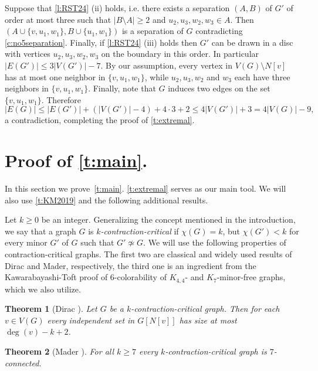 \documentclass[reqno,final,12pt]{amsart}
\newtheorem{thm}{Theorem}
\begin{document}
{Suppose that  \cref{l:RST24} (ii) holds, i.e. there exists a separation $(A,B)$ of $G'$ of order at most three such that $|B \setminus A| \geq 2$ and $u_2,u_3,w_2,w_3 \in A$. Then $(A \cup\{v,u_1,w_1\}, B \cup \{u_1,w_1\})$ is a separation of $G$ contradicting \cref{c:no5separation}. Finally, if   \cref{l:RST24} (iii) holds then $G'$ can be drawn in a disc with vertices $u_2,u_3,w_2,w_3$ on the boundary in this order. In particular $|E(G')| \leq 3|V(G')|-7$. By our assumption, every vertex in $V(G) \setminus N[v]$ has at most one neighbor in  $\{v,u_1,w_1\}$, while $u_2,u_3,w_2$ and $w_3$ each have three neighbors in $\{v,u_1,w_1\}$. Finally, note that $G$ induces two edges on the set  $\{v,u_1,w_1\}$. Therefore
$$ |E(G)| \leq |E(G')| + (|V(G')| -4)  + 4\cdot 3 + 2 \leq 4|V(G')| + 3 = 4|V(G)|-9,
$$
a contradiction, completing the proof of \cref{t:extremal}.


\section {Proof of \cref{t:main}.}\label{s:main} 

In this section we prove~\cref{t:main}. \cref{t:extremal} serves as our main tool. We will also use \cref{t:KM2019} and  the following additional results.

Let $k \geq 0$ be an integer.
Generalizing the concept mentioned in the introduction, we say that a graph $G$ is \emph{$k$-contraction-critical}  if $\chi(G)=k$, but $\chi(G') < k$ for every minor $G'$ of $G$ such that $G' \not\simeq G$. We will use the following properties of contraction-critical graphs.
The first two are classical and widely used results of Dirac and Mader, respectively, the third one is an ingredient from the  Kawarabayashi-Toft proof of $6$-colorability of $K_{4,4}$- and $K_7$-minor-free graphs, which we also utilize. 

\begin{thm}[Dirac \cite{Dirac1960}]\label{t:Dirac} Let $G$ be a $k$-contraction-critical graph. Then for each $v \in V(G)$ every independent set in $G[N[v]]$ has size at most $\deg(v) - k + 2$.
\end{thm}

\begin{thm}[Mader \cite{Mader1967}]\label{t:Mader} For all $k \geq 7$ every  $k$-contraction-critical graph is $7$-connected.
\end{thm}		


}
\end{document}
